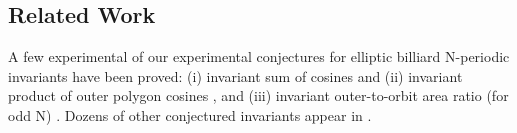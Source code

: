 \subsection*{Related Work}

A few experimental of our experimental conjectures for elliptic billiard N-periodic invariants \cite{reznik2020-intelligencer,garcia2020-new-properties} have been proved: (i) invariant sum of cosines and (ii) invariant product of outer polygon cosines \cite{akopyan2020-invariants,bialy2020-invariants}, and (iii) invariant outer-to-orbit area ratio (for odd N) \cite{caliz2020-area-product}. Dozens of other conjectured invariants appear in \cite{reznik2021-fifty}.